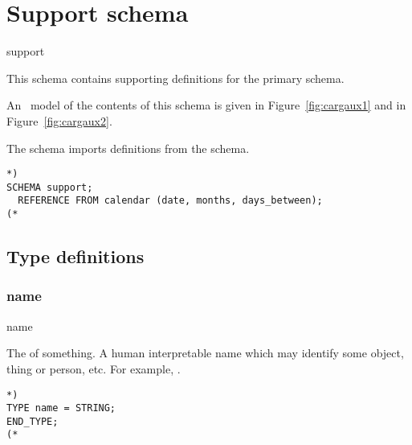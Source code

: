 \documentclass{article}
\providecommand*{\fref}[1]{Figure~\ref{#1}}
\begin{document}
 \section{Support schema}

 \begin{Mnamedesc}{support}
 \begin{Mdesctext}
     This schema contains supporting definitions for the primary
  schema.

     An \ExpressG\ model of the contents of this schema is given in 
 \fref{fig:cargaux1} and in \fref{fig:cargaux2}.


    The schema imports definitions from the  schema.
\end{Mdesctext}

\begin{Mexp}
\begin{verbatim}
*)
SCHEMA support;
  REFERENCE FROM calendar (date, months, days_between);
(*
\end{verbatim}
\end{Mexp}
\end{Mnamedesc}

\subsection{Type definitions}

\subsubsection{name}

\begin{Mnamedesc}{name}
\begin{Mdesctext}

The  of something. A human interpretable name which may identify some
object, thing or person, etc. For example, .

\end{Mdesctext}

\begin{Mexp}
\begin{verbatim}
*)
TYPE name = STRING;
END_TYPE;
(*
\end{verbatim}
\end{Mexp}
\end{Mnamedesc}
\end{document}
